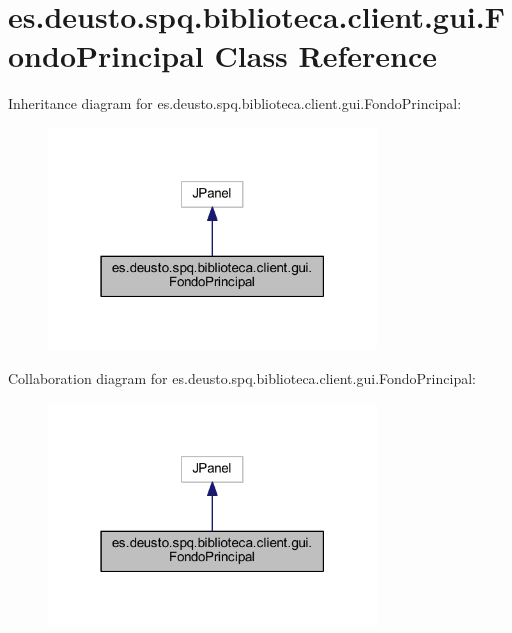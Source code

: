 \hypertarget{classes_1_1deusto_1_1spq_1_1biblioteca_1_1client_1_1gui_1_1_fondo_principal}{}\section{es.\+deusto.\+spq.\+biblioteca.\+client.\+gui.\+Fondo\+Principal Class Reference}
\label{classes_1_1deusto_1_1spq_1_1biblioteca_1_1client_1_1gui_1_1_fondo_principal}


Inheritance diagram for es.\+deusto.\+spq.\+biblioteca.\+client.\+gui.\+Fondo\+Principal\+:
\nopagebreak
\begin{figure}[H]
\begin{center}
\leavevmode
\includegraphics[width=247pt]{classes_1_1deusto_1_1spq_1_1biblioteca_1_1client_1_1gui_1_1_fondo_principal__inherit__graph}
\end{center}
\end{figure}


Collaboration diagram for es.\+deusto.\+spq.\+biblioteca.\+client.\+gui.\+Fondo\+Principal\+:
\nopagebreak
\begin{figure}[H]
\begin{center}
\leavevmode
\includegraphics[width=247pt]{classes_1_1deusto_1_1spq_1_1biblioteca_1_1client_1_1gui_1_1_fondo_principal__coll__graph}
\end{center}
\end{figure}
